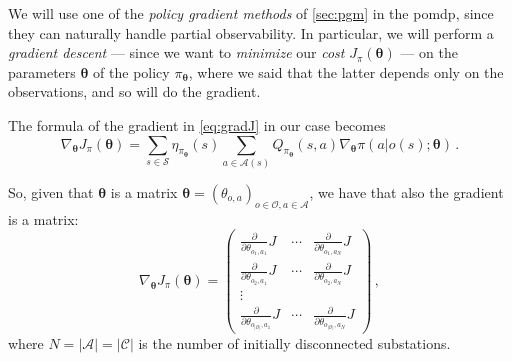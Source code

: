 We will use one of the \emph{policy gradient methods} of \autoref{sec:pgm} in the \acrshort{pomdp}, since they can naturally handle partial observability. In particular, we will perform a \emph{gradient descent} --- since we want to \textit{minimize} our \textit{cost} $J_\pi(\boldsymbol \theta)$ --- on the parameters $\boldsymbol \theta$ of the policy $\pi_{\boldsymbol \theta}$, where we said that the latter depends only on the observations, and so will do the gradient.

The formula of the gradient in \eqref{eq:gradJ} in our case becomes
\begin{equation}
    \nabla_{\boldsymbol \theta} J_\pi (\boldsymbol \theta) = \sum_{s \in \mathcal S} \eta_{\pi_{\boldsymbol \theta}}(s) \sum_{a \in \mathcal A(s)} Q_{\pi_{\boldsymbol \theta}}(s,a) \nabla_{\boldsymbol \theta} \pi(a|o(s); \boldsymbol \theta) \, .
    \label{eq:mygradJ_oneline}
\end{equation}

So, given that $\boldsymbol \theta$ is a matrix $\boldsymbol \theta = (\theta_{o,a})_{o \in \mathcal O, a \in \mathcal A}$, we have that also the gradient is a matrix:
\begin{equation}
    \nabla_{\boldsymbol \theta} J_\pi (\boldsymbol \theta) = \begin{pmatrix}
        \frac{\partial}{\partial \theta_{o_1, a_1}} J & \cdots & \frac{\partial}{\partial \theta_{o_1, a_N}} J \\
        \frac{\partial}{\partial \theta_{o_2, a_1}} J &  \cdots & \frac{\partial}{\partial \theta_{o_2, a_N}} J \\
        \vdots \\
        \frac{\partial}{\partial \theta_{o_{|\mathcal O|}, a_1}} J & \cdots & \frac{\partial}{\partial \theta_{o_{|\mathcal O|}, a_N}} J
    \end{pmatrix} \, ,
\end{equation}
where $N = |\mathcal A| = |\mathcal C|$ is the number of initially disconnected substations.

